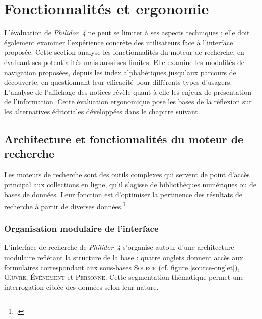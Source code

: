 \section{Fonctionnalités et ergonomie}

L'évaluation de \textit{Philidor~4} ne peut se limiter à ses aspects techniques ; elle doit également examiner l'expérience concrète des utilisateurs face à l'interface proposée. Cette section analyse les fonctionnalités du moteur de recherche, en évaluant ses potentialités mais aussi ses limites. Elle examine les modalités de navigation proposées, depuis les index alphabétiques jusqu'aux parcours de découverte, en questionnant leur efficacité pour différents types d'usagers. L'analyse de l'affichage des notices révèle quant à elle les enjeux de présentation de l'information. Cette évaluation ergonomique pose les bases de la réflexion sur les alternatives éditoriales développées dans le chapitre suivant.

\subsection{Architecture et fonctionnalités du moteur de recherche}

Les moteurs de recherche sont des outils complexes qui servent de point d'accès principal aux collections en ligne, qu'il s'agisse de bibliothèques numériques ou de bases de données. Leur fonction est d'optimiser la pertinence des résultats de recherche à partir de diverses données.\footcite{bermesMoteursRecherche2007}

\subsubsection{Organisation modulaire de l'interface}

L'interface de recherche de \textit{Philidor~4} s'organise autour d'une architecture modulaire reflétant la structure de la base : quatre onglets donnent accès aux formulaires correspondant aux sous-bases \textsc{Source} (cf. figure \ref{source-onglet}), \textsc{Œuvre}, \textsc{Événement} et \textsc{Personne}. Cette segmentation thématique permet une interrogation ciblée des données selon leur nature.

